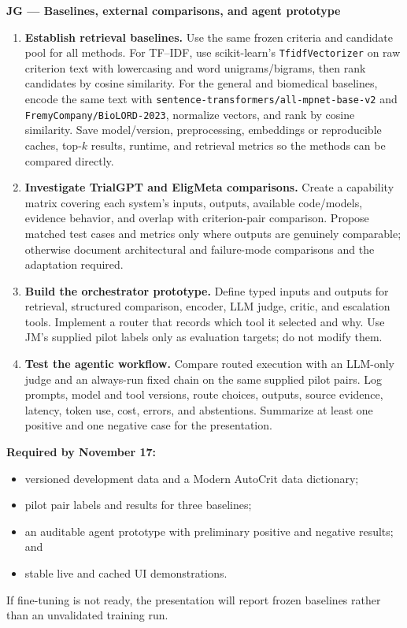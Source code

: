 \documentclass[10pt]{article}
\newcommand{\code}[1]{\texttt{#1}}
\begin{document}
\textbf{JG --- Baselines, external comparisons, and agent prototype}
\begin{enumerate}
\item \textbf{Establish retrieval baselines.} Use the same frozen criteria and candidate pool for all methods. For TF--IDF, use scikit-learn's \code{TfidfVectorizer} on raw criterion text with lowercasing and word unigrams/bigrams, then rank candidates by cosine similarity. For the general and biomedical baselines, encode the same text with \code{sentence-transformers/all-mpnet-base-v2} and \code{FremyCompany/BioLORD-2023}, normalize vectors, and rank by cosine similarity. Save model/version, preprocessing, embeddings or reproducible caches, top-$k$ results, runtime, and retrieval metrics so the methods can be compared directly.
\item \textbf{Investigate TrialGPT and EligMeta comparisons.} Create a capability matrix covering each system's inputs, outputs, available code/models, evidence behavior, and overlap with criterion-pair comparison. Propose matched test cases and metrics only where outputs are genuinely comparable; otherwise document architectural and failure-mode comparisons and the adaptation required.
\item \textbf{Build the orchestrator prototype.} Define typed inputs and outputs for retrieval, structured comparison, encoder, LLM judge, critic, and escalation tools. Implement a router that records which tool it selected and why. Use JM's supplied pilot labels only as evaluation targets; do not modify them.
\item \textbf{Test the agentic workflow.} Compare routed execution with an LLM-only judge and an always-run fixed chain on the same supplied pilot pairs. Log prompts, model and tool versions, route choices, outputs, source evidence, latency, token use, cost, errors, and abstentions. Summarize at least one positive and one negative case for the presentation.
\end{enumerate}
\textbf{Required by November 17:}
\begin{itemize}
\item versioned development data and a Modern AutoCrit data dictionary;
\item pilot pair labels and results for three baselines;
\item an auditable agent prototype with preliminary positive and negative results; and
\item stable live and cached UI demonstrations.
\end{itemize}
If fine-tuning is not ready, the presentation will report frozen baselines rather than an unvalidated training run.
\end{document}
